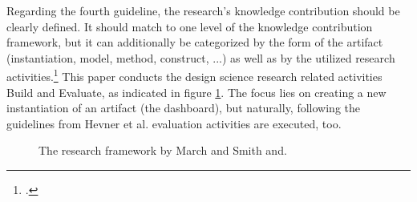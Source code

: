 Regarding the fourth guideline, the research's knowledge contribution should be clearly defined. It should match to one level of the knowledge contribution framework, but it can additionally be categorized by the form of the artifact (instantiation, model, method, construct, ...) as well as by the utilized research activities.\footcite[Cf.][p.255]{MarchDesignnaturalscience1995} This paper conducts the design science research related activities Build and Evaluate, as indicated in figure \ref{fig:researchFR}. The focus lies on creating a new instantiation of an artifact (the dashboard), but naturally, following the guidelines from Hevner et al. evaluation activities are executed, too.

\begin{figure}
    \centering
    
    \caption[The research framework by March and Smith.]{The research framework by March and Smith and.\footnotemark}
    \label{fig:researchFR}
\end{figure}



